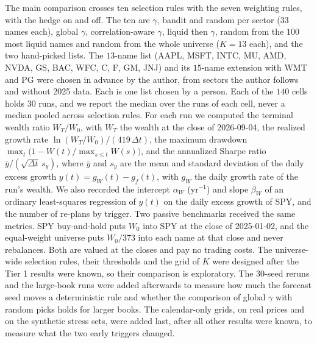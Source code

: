 The main comparison crosses ten selection rules with the seven weighting rules, with the hedge on and off. The ten
are $\gamma$, bandit and random per sector ($33$ names each), global $\gamma$, correlation-aware $\gamma$, liquid
then $\gamma$, random from the $100$ most liquid names and random from the whole universe ($K = 13$ each), and the
two hand-picked lists. The $13$-name list (AAPL, MSFT, INTC, MU, AMD, NVDA, GS, BAC, WFC, C, F, GM, JNJ) and its
$15$-name extension with WMT and PG were chosen in advance by the author, from sectors the author follows and
without 2025 data. Each is one list chosen by a person. Each of the $140$ cells holds $30$ runs, and we report the
median over the runs of each cell, never a median pooled across selection rules. For each run we computed the
terminal wealth ratio $W_T/W_0$, with $W_T$ the wealth at the close of 2026-09-04, the realized growth rate
$\ln(W_T/W_0)/(419\,\Delta t)$, the maximum drawdown $\max_t\big(1 - W(t)/\max_{s \le t} W(s)\big)$, and the
annualized Sharpe ratio~\cite{sharpe1966} $\bar y/(\sqrt{\Delta t}\,s_y)$, where $\bar y$ and $s_y$ are the mean and
standard deviation of the daily excess growth $y(t) = g_W(t) - g_f(t)$, with $g_W$ the daily growth rate of the
run's wealth. We also recorded the intercept $\alpha_W$ ($\mathrm{yr}^{-1}$) and slope $\beta_W$ of an ordinary least-squares regression of $y(t)$ on the daily excess growth
of SPY, and the number of re-plans by trigger. Two passive benchmarks received the same metrics. SPY buy-and-hold
puts $W_0$ into SPY at the close of 2025-01-02, and the equal-weight universe puts $W_0/373$ into each name at that
close and never rebalances. Both are valued at the closes and pay no trading costs. The universe-wide selection
rules, their thresholds and the grid of $K$ were designed after the Tier 1 results were known, so their comparison
is exploratory. The $30$-seed reruns and the large-book runs were added afterwards to measure how much the forecast
seed moves a deterministic rule and whether the comparison of global $\gamma$ with random picks holds for larger
books. The calendar-only grids, on real prices and on the synthetic stress sets, were added last, after all other
results were known, to measure what the two early triggers changed.

